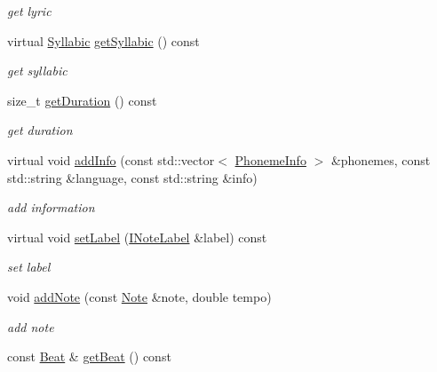 \begin{DoxyCompactItemize}
\begin{DoxyCompactList}\small\item\em get lyric \end{DoxyCompactList}\item 
\hypertarget{classsinsy_1_1NoteLabeler_a4aa0089013e5598ef7e517ffcef63dea}{virtual \hyperlink{classsinsy_1_1Syllabic}{\-Syllabic} \hyperlink{classsinsy_1_1NoteLabeler_a4aa0089013e5598ef7e517ffcef63dea}{get\-Syllabic} () const }\label{classsinsy_1_1NoteLabeler_a4aa0089013e5598ef7e517ffcef63dea}

\begin{DoxyCompactList}\small\item\em get syllabic \end{DoxyCompactList}\item 
\hypertarget{classsinsy_1_1NoteLabeler_ab27386272cbbee6f9b546dcbf3555e7e}{size\-\_\-t \hyperlink{classsinsy_1_1NoteLabeler_ab27386272cbbee6f9b546dcbf3555e7e}{get\-Duration} () const }\label{classsinsy_1_1NoteLabeler_ab27386272cbbee6f9b546dcbf3555e7e}

\begin{DoxyCompactList}\small\item\em get duration \end{DoxyCompactList}\item 
virtual void \hyperlink{classsinsy_1_1NoteLabeler_a5be5f059a3b710eb0ec054d508d63e1a}{add\-Info} (const std\-::vector$<$ \hyperlink{classsinsy_1_1PhonemeInfo}{\-Phoneme\-Info} $>$ \&phonemes, const std\-::string \&language, const std\-::string \&info)
\begin{DoxyCompactList}\small\item\em add information \end{DoxyCompactList}\item 
virtual void \hyperlink{classsinsy_1_1NoteLabeler_afce8f71c437e03b1acb894a5335cbe31}{set\-Label} (\hyperlink{classsinsy_1_1INoteLabel}{\-I\-Note\-Label} \&label) const 
\begin{DoxyCompactList}\small\item\em set label \end{DoxyCompactList}\item 
void \hyperlink{classsinsy_1_1NoteLabeler_a66723aa4d1f9f4327752b9ebb2ce0061}{add\-Note} (const \hyperlink{classsinsy_1_1Note}{\-Note} \&note, double tempo)
\begin{DoxyCompactList}\small\item\em add note \end{DoxyCompactList}\item 
\hypertarget{classsinsy_1_1NoteLabeler_a39daa254597bd51f42c20002f6c47d84}{const \hyperlink{classsinsy_1_1Beat}{\-Beat} \& \hyperlink{classsinsy_1_1NoteLabeler_a39daa254597bd51f42c20002f6c47d84}{get\-Beat} () const }\label{classsinsy_1_1NoteLabeler_a39daa254597bd51f42c20002f6c47d84}


\end{DoxyCompactItemize}
